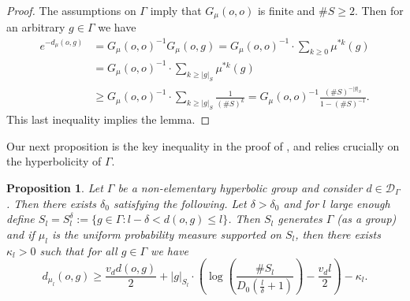 \documentclass[twoside]{amsart}
\newtheorem{proposition}[theorem]{Proposition}
\theoremstyle{definition}
\numberwithin{equation}{section}
\numberwithin{theorem}{section}
\newcommand{\calD}{\mathcal{D}}
\newcommand{\G}{\Gamma}
\newcommand{\del}{\delta}
\renewcommand{\k}{\kappa}
\newcommand{\m}{\mu}
\begin{document}
\begin{proof}
    The assumptions on $\G$ imply that $G_\m(o,o)$ is finite and $\#S\geq 2$. Then for an arbitrary $g\in \G$ we have
    \begin{align*}
        e^{-d_\m(o,g)} & =G_\m(o,o)^{-1}G_\m(o,g)=G_\m(o,o)^{-1}\cdot \sum_{k\geq 0}{\m^{\ast k}(g)} \\
        & =G_\m(o,o)^{-1} \cdot \sum_{k\geq |g|_S}{\m^{\ast k}(g)}\\
        & \geq G_\m(o,o)^{-1}\cdot \sum_{k\geq |g|_S}{\frac{1}{(\#S)^k}} =G_\m(o,o)^{-1}\frac{(\#S)^{-|g|_S}}{1-(\#S)^{-1}}.    \end{align*}
        This last inequality implies the lemma.
\end{proof}

Our next proposition is the key inequality in the proof of , and relies crucially on the hyperbolicity of $\G$.

\begin{proposition}\label{prop.greenmetricineqHYP}
    Let $\G$ be a non-elementary hyperbolic group and consider $d\in \calD_\G$. Then there exists $\del_0$ satisfying the following. Let $\del>\del_0$ and for $l$ large enough define $S_l=S_l^\del:=\{g\in \G \colon l-\del< d(o,g)\leq l\}$. Then $S_l$ generates $\G$ (as a group) and if $\m_l$ is the uniform probability measure supported on $S_l$, then there exists $\k_l>0$ such that for all $g\in \G$ we have \begin{equation}\label{eq.propdGreen}
            d_{\m_l}(o,g)\geq \frac{v_dd(o,g)}{2}+|g|_{S_l}\cdot \left(\log\left(\frac{\#S_l}{D_0\left(\frac{l}{\del}+1\right)}\right)-\frac{v_d l}{2}\right)-\k_l.
        \end{equation}
\end{proposition}
\end{document}
